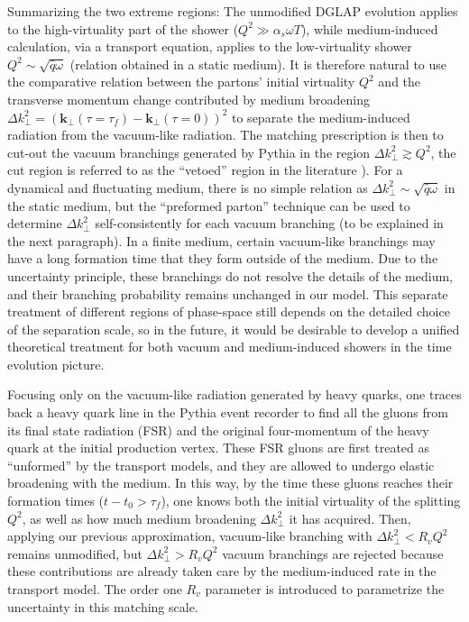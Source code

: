 Summarizing the two extreme regions:
The unmodified DGLAP evolution applies to the high-virtuality part of the shower ($Q^2 \gg \alpha_s \omega T$), while medium-induced calculation, via a transport equation, applies to the low-virtuality shower $Q^2 \sim \sqrt{\hat{q}\omega}$ (relation obtained in a static medium).
It is therefore natural to use the comparative relation between the partons' initial virtuality $Q^2$ and the transverse momentum change contributed by medium broadening $\Delta k_\perp^2 = (\mathbf{k}_\perp(\tau=\tau_f) - \mathbf{k}_\perp(\tau=0))^2$ to separate the medium-induced radiation from the vacuum-like radiation.
The matching prescription is then to cut-out the vacuum branchings generated by Pythia in the region $\Delta k_\perp^2 \gtrsim Q^2$, the cut region is referred to as the ``vetoed'' region in the literature \cite{PhysRevLett.120.232001}).
For a dynamical and fluctuating medium, there is no simple relation as $\Delta k_\perp^2\sim \sqrt{\hat{q}\omega}$ in the static medium, but the ``preformed parton'' technique can be used to determine $\Delta k_\perp^2$ self-consistently for each vacuum branching (to be explained in the next paragraph).
In a finite medium, certain vacuum-like branchings may have a long formation time that they form outside of the medium.
Due to the uncertainty principle, these branchings do not resolve the details of the medium, and their branching probability remains unchanged in our model.
This separate treatment of different regions of phase-space still depends on the detailed choice of the separation scale, so in the future, it would be desirable to develop a unified theoretical treatment for both vacuum and medium-induced showers in the time evolution picture.

Focusing only on the vacuum-like radiation generated by heavy quarks, one traces back a heavy quark line in the Pythia event recorder to find all the gluons from its final state radiation (FSR) and the original four-momentum of the heavy quark at the initial production vertex.
These FSR gluons are first treated as ``unformed'' by the transport models, and they are allowed to undergo elastic broadening with the medium.
In this way, by the time these gluons reaches their formation times ($t-t_0>\tau_f$), one knows both the initial virtuality of the splitting $Q^2$, as well as how much medium broadening $\Delta k_\perp^2$ it has acquired.
Then, applying our previous approximation, vacuum-like branching with 
$\Delta k_\perp^2 < R_v Q^2$ remains unmodified, but $\Delta k_\perp^2 > R_v Q^2$ vacuum branchings are rejected because these contributions are already taken care by the medium-induced rate in the transport model.
The order one $R_v$ parameter is introduced to parametrize the uncertainty in this matching scale.

